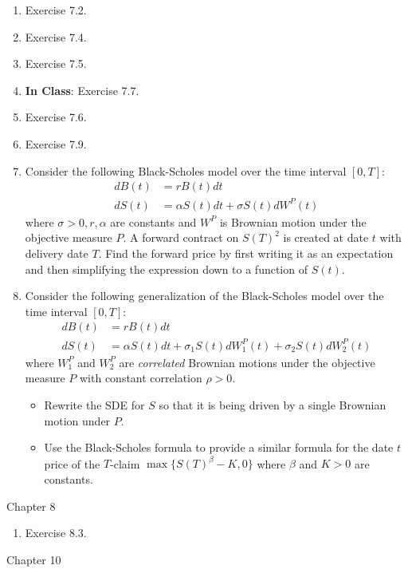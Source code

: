 \documentclass[12pt]{article}
\renewcommand{\a}{\alpha}
\renewcommand{\b}{\beta}
\newcommand{\p}{\rho}
\newcommand{\s}{\sigma}
\begin{document}
\begin{enumerate}
  \item Exercise 7.2.
  \item Exercise 7.4.
  \item Exercise 7.5.
  \item[] \textbf{In Class}: Exercise 7.7.
  \item Exercise 7.6.
  \item Exercise 7.9.
  \item Consider the following Black-Scholes model over the time interval $[0, T]$:
\begin{align*}
dB(t)		& = r B(t) dt\\
dS(t)		& = \a S(t) dt + \s S(t) dW^P(t)
\end{align*}
where $\s > 0, r, \a$ are constants and $W^P$ is Brownian motion under the objective measure $P$. A forward contract on $S(T)^2$ is created at date $t$ with delivery date $T$. Find the forward price by first writing it as an expectation and then simplifying the expression down to a function of $S(t)$.
  \item Consider the following generalization of the Black-Scholes model over the time interval $[0, T]$:
\begin{align*}
dB(t)			& = r B(t) dt\\
dS(t)			& = \a S(t) dt + \s_1 S(t) dW_1^P(t) + \s_2 S(t) dW_2^P(t)
\end{align*}
where $W_1^P$ and $W_2^P$ are \emph{correlated} Brownian motions under the objective measure $P$ with constant correlation $\p > 0$.
  \begin{itemize}
    \item Rewrite the SDE for $S$ so that it is being driven by a single Brownian motion under $P$.
    \item Use the Black-Scholes formula to provide a similar formula for the date $t$ price of the $T$-claim $\max\{S(T)^{\b} - K, 0\}$ where $\b$ and $K > 0$ are constants.
  \end{itemize}
\end{enumerate}



Chapter 8

\begin{enumerate}
  \item Exercise 8.3.
\end{enumerate}

Chapter 10
\end{document}
